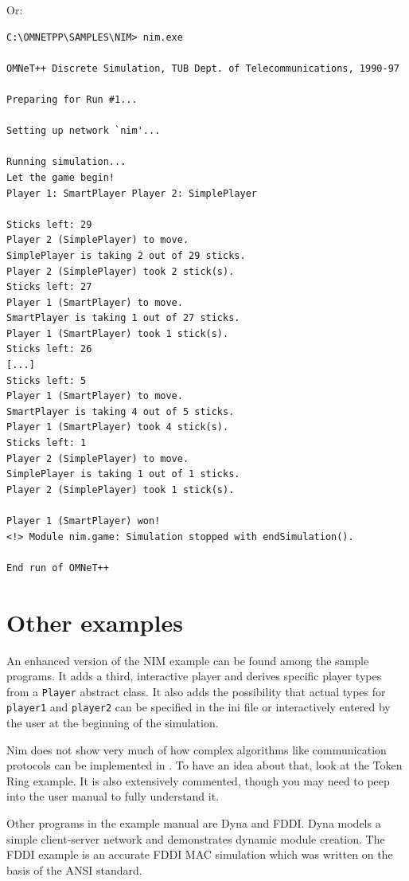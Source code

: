Or:

\begin{Verbatim}
C:\OMNETPP\SAMPLES\NIM> nim.exe

OMNeT++ Discrete Simulation, TUB Dept. of Telecommunications, 1990-97

Preparing for Run #1...

Setting up network `nim'...

Running simulation...
Let the game begin!
Player 1: SmartPlayer Player 2: SimplePlayer

Sticks left: 29
Player 2 (SimplePlayer) to move.
SimplePlayer is taking 2 out of 29 sticks.
Player 2 (SimplePlayer) took 2 stick(s).
Sticks left: 27
Player 1 (SmartPlayer) to move.
SmartPlayer is taking 1 out of 27 sticks.
Player 1 (SmartPlayer) took 1 stick(s).
Sticks left: 26
[...]
Sticks left: 5
Player 1 (SmartPlayer) to move.
SmartPlayer is taking 4 out of 5 sticks.
Player 1 (SmartPlayer) took 4 stick(s).
Sticks left: 1
Player 2 (SimplePlayer) to move.
SimplePlayer is taking 1 out of 1 sticks.
Player 2 (SimplePlayer) took 1 stick(s).

Player 1 (SmartPlayer) won!
<!> Module nim.game: Simulation stopped with endSimulation().

End run of OMNeT++
\end{Verbatim}






\section{Other examples}

An enhanced version of the NIM example can be found among the sample
programs. It adds a third, interactive player and derives specific
player types from a \texttt{Player} abstract class. It also adds the
possibility that actual types for \texttt{player1} and
\texttt{player2} can be specified in the ini file or interactively
entered by the user at the beginning of the simulation.

Nim does not show very much of how complex algorithms like communication 
protocols can be implemented in {\opp}. To have an idea about 
that, look at the Token Ring example. It is also extensively 
commented, though you may need to peep into the user manual to 
fully understand it.

Other programs in the example manual are Dyna and FDDI. Dyna 
models a simple client-server network and demonstrates dynamic 
module creation. The FDDI example is an accurate FDDI MAC simulation 
which was written on the basis of the ANSI standard.


